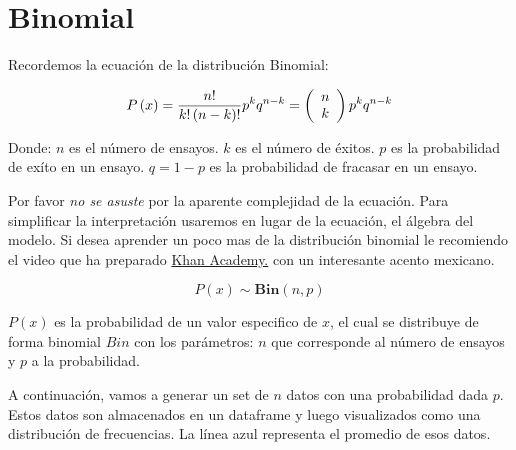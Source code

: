 \documentclass[
]{book}
\begin{document}
\hypertarget{binomial}{%
\section{Binomial}\label{binomial}}

Recordemos la ecuación de la distribución Binomial:

\begin{equation} 
  P\left( x \right) = \frac{{n!}}{{k!\left( {n - k} \right)!}}p^k q^{n - k} = \left( {\begin{array}{*{20}c} n \\ k \\ \end{array}} \right)p^k q^{n - k}
  \label{eq:binom}
\end{equation}

Donde:
\(n\) es el número de ensayos.
\(k\) es el número de éxitos.
\(p\) es la probabilidad de exíto en un ensayo.
\(q=1-p\) es la probabilidad de fracasar en un ensayo.

Por favor \emph{no se asuste} por la aparente complejidad de la ecuación. Para simplificar la interpretación usaremos en lugar de la ecuación, el álgebra del modelo. Si desea aprender un poco mas de la distribución binomial le recomiendo el video que ha preparado \href{https://www.youtube.com/watch?v=sRoflgDiCKo}{Khan Academy.} con un interesante acento mexicano.

\begin{equation} 
  P\left( x \right) \sim \mathbf{Bin}(n,p)
  \label{eq:binom}
\end{equation}

\(P(x)\) es la probabilidad de un valor especifico de \(x\), el cual se distribuye de forma binomial \(Bin\) con los parámetros: \(n\) que corresponde al número de ensayos y \(p\) a la probabilidad.

A continuación, vamos a generar un set de \(n\) datos con una probabilidad dada \(p\). Estos datos son almacenados en un dataframe y luego visualizados como una distribución de frecuencias. La línea azul representa el promedio de esos datos.
\end{document}
